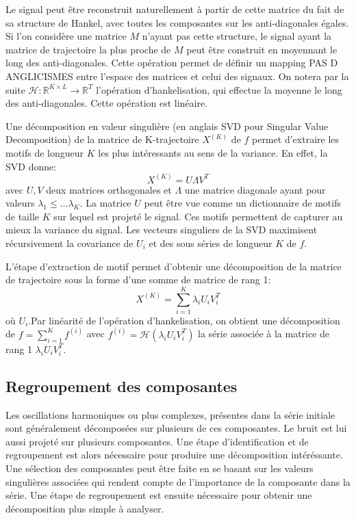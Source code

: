 \documentclass{gretsi}
\def\HH{\mathcal H}
\newcommand{\R}{\mathbb R}
\begin{document}
Le signal peut être reconstruit naturellement à partir de cette matrice du fait de sa structure de Hankel, avec toutes les composantes sur les anti-diagonales égales. Si l'on considère une matrice $M$ n'ayant pas cette structure, le signal ayant la matrice de trajectoire la plus proche de $M$ peut être construit en moyennant le long des anti-diagonales. Cette opération permet de définir un mapping PAS D ANGLICISMES entre l'espace des matrices et celui des signaux. On notera par la suite $\HH: \R^{K\times L} \to \R^T$ l'opération d'hankelisation, qui effectue la moyenne le long des anti-diagonales. Cette opération est linéaire.



Une décomposition en valeur singulière (en anglais SVD pour Singular Value Decomposition) de la matrice de K-trajectoire $X^{(K)}$ de $f$ permet d'extraire les motifs de longueur $K$ les plus intéressants au sens de la variance. En effet, la SVD donne: 
$$X^{(K)} = U \Lambda V^T
$$ avec $U, V$ deux matrices orthogonales et $\Lambda$ une matrice diagonale ayant pour valeurs $\lambda_1\le \dots \lambda_K$. La matrice $U$ peut être vue comme un dictionnaire de motifs de taille $K$ sur lequel est projeté le signal. Ces motifs permettent de capturer au mieux la variance du signal. Les vecteurs singuliers de la SVD maximisent récursivement la covariance de $U_i$ et des sous séries de longueur $K$ de $f$.



L'étape d'extraction de motif permet d'obtenir une décomposition de la matrice de trajectoire sous la forme d'une somme de matrice de rang 1:$$
X^{(K)} = \sum_{i=1}^K \lambda_i U_iV_i^T 
$$où  $U_i$.Par linéarité de l'opération d'hankelisation, on obtient une décomposition de $f = \sum_{i=1}^K f^{(i)}$ avec $f^{(i)} = \HH(\lambda_iU_iV_i^T)$ la série associée à la matrice de rang 1 $\lambda_iU_iV_i^T$.


\subsection{Regroupement des composantes}

Les oscillations harmoniques ou plus complexes, présentes dans la série initiale sont généralement décomposées sur plusieurs de ces composantes. Le bruit est lui aussi projeté sur plusieurs composantes. Une étape d'identification et de regroupement est alors nécessaire pour produire une décomposition intéréssante. Une sélection des composantes peut être faite en se basant sur les valeurs singulières associées qui rendent compte de l'importance de la composante dans la série. Une étape de regroupement est ensuite nécessaire pour obtenir une décomposition plus simple à analyser.
\end{document}

